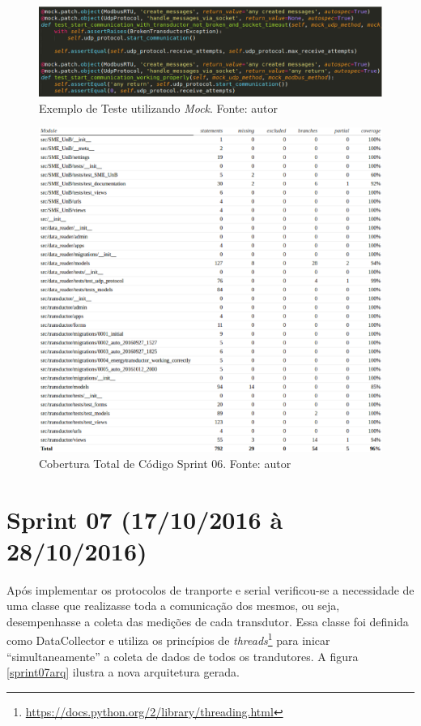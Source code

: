\begin{figure}[!htpb]
    \centering
    \includegraphics[keepaspectratio=true,scale=0.5]{figuras/exemplo_mock.eps}
    \caption{Exemplo de Teste utilizando \textit{Mock}. Fonte: autor}
    \label{exemplo_mock}
\end{figure}

\begin{figure}[!htpb]
    \centering
    \includegraphics[keepaspectratio=true,scale=0.5]{figuras/cobertura03.eps}
    \caption{Cobertura Total de Código Sprint 06. Fonte: autor}
    \label{cobertura03}
\end{figure}

\section{Sprint 07 (17/10/2016 à 28/10/2016)}
Após implementar os protocolos de tranporte e serial verificou-se a necessidade de uma classe que realizasse toda a comunicação dos mesmos, ou seja, desempenhasse a coleta das medições de cada transdutor. Essa classe foi definida como DataCollector e utiliza os princípios de \textit{threads}\footnote{\url{https://docs.python.org/2/library/threading.html}} para inicar ``simultaneamente'' a coleta de dados de todos os trandutores. A figura \ref{sprint07arq} ilustra a nova arquitetura gerada.

